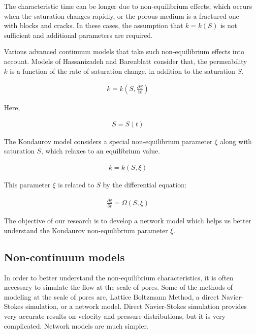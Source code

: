\documentclass{crm-article}
\begin{document}
			The characteristic time can be longer due to non-equilibrium effects, which occurs when the saturation changes rapidly, or the porous medium is a fractured one with blocks and cracks. In these cases, the assumption that $k = k(S)$ is not sufficient and additional parameters are required.

			Various advanced continuum models that take such non-equilibrium effects into account. Models of Hassanizadeh \cite{hassanizadeh2004continuum} \cite{hassanizadeh1987high} and Barenblatt \cite{barenblatt1960basic} consider that, the permeability $k$ is a function of the rate of saturation change, in addition to the saturation $S$.                  
			
			\begin{gather}
				k = k(S, \frac{\partial S}{\partial t})
			\end{gather}
			
			Here,
			
			\begin{gather}
				S = S(t)
			\end{gather}
			
			The Kondaurov model \cite{kondaurov2009non} considers a special non-equilibrium parameter $\xi$ along with saturation $S$, which relaxes to an equilibrium value. \cite{kondaurov2007thermodynamically}
			
			\begin{gather}
				k = k(S, \xi)
			\end{gather}
			
			This parameter $\xi$ is related to $S$ by the differential equation:
			
			\begin{gather}
				\frac{\partial \xi}{\partial t} = \Omega ( S, \xi )
			\end{gather}
			
			The objective of our research is to develop a network model which helps us better understand the Kondaurov non-equilibrium parameter $\xi$.
			 
		\subsection{Non-continuum models}
			In order to better understand the non-equilibrium characteristics, it is often necessary to simulate the flow at the scale of pores. Some of the methods of modeling at the scale of pores are, Lattice Boltzmann Method, a direct Navier-Stokes simulation, or a network model. Direct Navier-Stokes simulation provides very accurate results on velocity and pressure distributions, but it is very complicated. Network models are much simpler.
			
\end{document}
